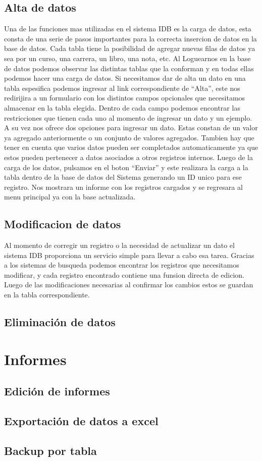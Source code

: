 \documentclass[a4paper,10pt]{article}
\begin{document}
\subsection{Alta de datos}
Una de las funciones mas utilizadas en el sistema IDB es la carga de datos, esta consta de una serie de pasos importantes para la correcta insercion de datos en la base de datos. Cada tabla tiene la posibilidad de agregar nuevas filas de datos ya sea por un curso, una carrera, un libro, una nota, etc. Al Loguearnos en la base de datos podemos observar las distintas tablas que la conforman y en todas ellas podemos hacer una carga de datos. 
Si necesitamos dar de alta un dato en una tabla espesifica podemos ingresar al link correspondiente de “Alta”, este nos redirijira a un formulario con los distintos campos opcionales que necesitamos almacenar en la tabla elegida. 
Dentro de cada campo podemos encontrar las restricciones que tienen cada uno al momento de ingresar un dato y un ejemplo. A su vez nos ofrece dos opciones para ingresar un dato. Estas constan de un valor ya agregado anteriormente o un conjunto de valores agregados. Tambien hay que tener en cuenta que varios datos pueden ser completados automaticamente ya que estos pueden pertenecer a datos asociados a otros registros internos. 
Luego de la carga de los datos, pulsamos en el boton “Enviar” y este realizara la carga a la tabla dentro de la base de datos del Sistema generando un ID unico para ese registro. Nos mostrara un informe con los registros cargados y se regresara al menu principal ya con la base actualizada.

\subsection{Modificacion de datos}

Al momento de corregir un registro o la necesidad de actualizar un dato el sistema IDB proporciona un servicio simple para llevar a cabo esa tarea. Gracias a los sistemas de busqueda podemos encontrar los registros que necesitamos modificar, y cada registro encontrado contiene una funsion directa de edicion. Luego de las modificaciones necesarias al confirmar los cambios estos se guardan en la tabla correspondiente.
 
\subsection{Eliminación de datos}


\section{Informes}
\subsection{Edición de informes}
\subsection{Exportación de datos a excel}
\subsection{Backup por tabla}
\end{document}
